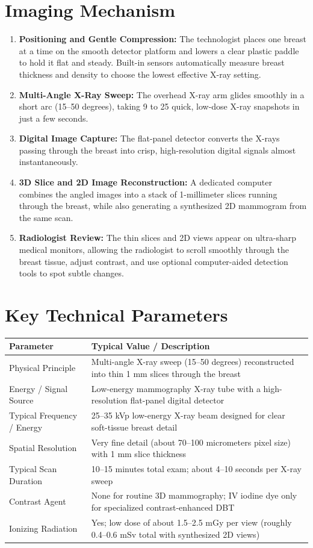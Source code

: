 \section{Imaging Mechanism}
\begin{enumerate}
\item \textbf{Positioning and Gentle Compression:} The technologist places one breast at a time on the smooth detector platform and lowers a clear plastic paddle to hold it flat and steady. Built-in sensors automatically measure breast thickness and density to choose the lowest effective X-ray setting.
\item \textbf{Multi-Angle X-Ray Sweep:} The overhead X-ray arm glides smoothly in a short arc (15--50 degrees), taking 9 to 25 quick, low-dose X-ray snapshots in just a few seconds.
\item \textbf{Digital Image Capture:} The flat-panel detector converts the X-rays passing through the breast into crisp, high-resolution digital signals almost instantaneously.
\item \textbf{3D Slice and 2D Image Reconstruction:} A dedicated computer combines the angled images into a stack of 1-millimeter slices running through the breast, while also generating a synthesized 2D mammogram from the same scan.
\item \textbf{Radiologist Review:} The thin slices and 2D views appear on ultra-sharp medical monitors, allowing the radiologist to scroll smoothly through the breast tissue, adjust contrast, and use optional computer-aided detection tools to spot subtle changes.
\end{enumerate}

\section{Key Technical Parameters}
\noindent
\begin{tabularx}{\textwidth}{@{}l X@{}}
\toprule
\textbf{Parameter} & \textbf{Typical Value / Description} \\
\midrule
Physical Principle & Multi-angle X-ray sweep (15--50 degrees) reconstructed into thin 1 mm slices through the breast \\
Energy / Signal Source & Low-energy mammography X-ray tube with a high-resolution flat-panel digital detector \\
Typical Frequency / Energy & 25--35 kVp low-energy X-ray beam designed for clear soft-tissue breast detail \\
Spatial Resolution & Very fine detail (about 70--100 micrometers pixel size) with 1 mm slice thickness \\
Typical Scan Duration & 10--15 minutes total exam; about 4--10 seconds per X-ray sweep \\
Contrast Agent & None for routine 3D mammography; IV iodine dye only for specialized contrast-enhanced DBT \\
Ionizing Radiation & Yes; low dose of about 1.5--2.5 mGy per view (roughly 0.4--0.6 mSv total with synthesized 2D views) \\
\bottomrule
\end{tabularx}

